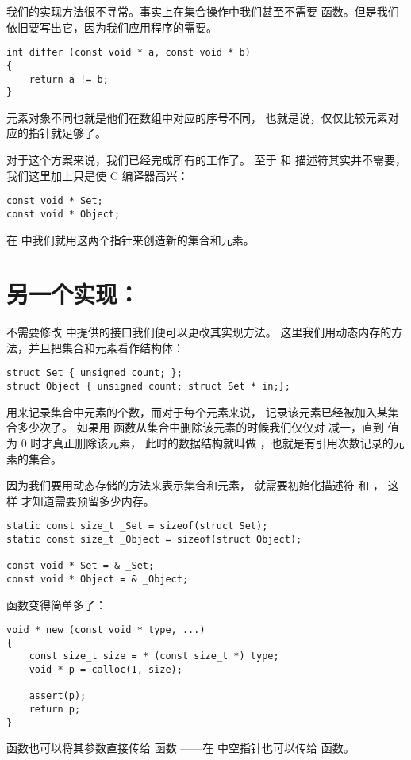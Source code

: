 我们的实现方法很不寻常。事实上在集合操作中我们甚至不需要
 函数。但是我们依旧要写出它，因为我们应用程序的需要。
\begin{lstlisting}
int differ (const void * a, const void * b)
{
	return a != b;
}
\end{lstlisting}
元素对象不同也就是他们在数组中对应的序号不同，
也就是说，仅仅比较元素对应的指针就足够了。

对于这个方案来说，我们已经完成所有的工作了。
至于  和  描述符其实并不需要，
我们这里加上只是使 C 编译器高兴：
\begin{lstlisting}
const void * Set;
const void * Object;
\end{lstlisting}
在  中我们就用这两个指针来创造新的集合和元素。

\section{另一个实现：}
\label{sec:bag}
不需要修改  中提供的接口我们便可以更改其实现方法。
这里我们用动态内存的方法，并且把集合和元素看作结构体：
\begin{lstlisting}
struct Set { unsigned count; };
struct Object { unsigned count; struct Set * in;};
\end{lstlisting}
 用来记录集合中元素的个数，而对于每个元素来说，
 记录该元素已经被加入某集合多少次了。
如果用  函数从集合中删除该元素的时候我们仅仅对
 减一，直到  值为 0 时才真正删除该元素，
此时的数据结构就叫做 ，也就是有引用次数记录的元素的集合。

因为我们要用动态存储的方法来表示集合和元素，
就需要初始化描述符  和 ，
这样  才知道需要预留多少内存。
\begin{lstlisting}
static const size_t _Set = sizeof(struct Set);
static const size_t _Object = sizeof(struct Object);

const void * Set = & _Set;
const void * Object = & _Object;
\end{lstlisting}
 函数变得简单多了：
\begin{lstlisting}
void * new (const void * type, ...)
{
	const size_t size = * (const size_t *) type;
	void * p = calloc(1, size);

	assert(p);
	return p;
}
\end{lstlisting}
 函数也可以将其参数直接传给  函数
——在  中空指针也可以传给  函数。

